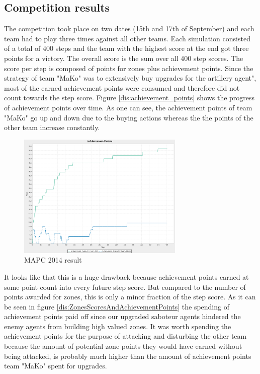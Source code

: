 \subsection{Competition results}
The competition took place on two dates (15th and 17th of September) and each team had to play three times against all other teams. Each simulation consisted of a total of 400 steps and the team with the highest score at the end got three points for a victory. The overall score is the sum over all 400 step scores. The score per step is composed of points for zones plus achievement points. Since the strategy of team "MaKo" was to extensively buy upgrades for the artillery agent", most of the earned achievement points were consumed and therefore did not count towards the step score. Figure \autoref{dis:achievement_points} shows the progress of achievement points over time. As one can see, the achievement points of team "MaKo" go up and down due to the buying actions whereas the the points of the other team increase constantly. 
\begin{figure}[ht]
	\centering
	\includegraphics[width=300px]{images/AchievementPoints.png}
	\caption{MAPC 2014 result}
	\label{dis:achievement_points}
\end{figure}
It looks like that this is a huge drawback because achievement points earned at some point count into every future step score. But compared to the number of points awarded for zones, this is only a minor fraction of the step score. As it can be seen in figure \autoref{dis:ZonesScoresAndAchievementPoints} the spending of achievement points paid off since our upgraded saboteur agents hindered the enemy agents from building high valued zones. It was worth spending the achievement points for the purpose of attacking and disturbing the other team because the amount of potential zone points they would have earned without being attacked, is probably much higher than the amount of achievement points team "MaKo" spent for upgrades.
